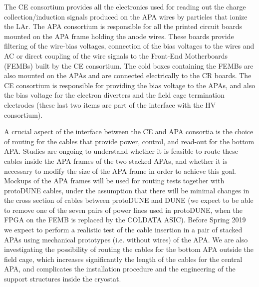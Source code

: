 The CE consortium provides all the electronics used for reading out the charge
collection/induction signals produced on the APA wires by particles that ionize
the LAr. The APA consortium
is responsible for all the printed circuit boards mounted on the APA frame
holding the anode wires. These boards provide filtering of the wire-bias voltages,
connection of the bias voltages to the wires and AC or direct coupling of the
wire signals to the Front-End Motherboards (FEMBs) built by the CE consortium.
The cold boxes containing the FEMBs are also mounted on the APAs and are connected
electrically to the CR boards. The CE consortium is responsible for providing the bias
voltage to the APAs, and also the bias voltage for the electron diverters and the field
cage termination electrodes (these last two items are part of the interface with
the HV consortium).

A crucial aspect of the interface between the CE and APA consortia
is the choice of routing for the cables that provide power, control, and read-out
for the bottom APA. Studies are ongoing to understand whether it is feasible to
route these cables inside the APA frames of the two stacked APAs, and whether it
is necessary to modify the size of the APA frame in order to achieve this goal.
Mockups of the APA frames will be used for routing tests together with protoDUNE
cables, under the assumption that there will be minimal changes in the cross
section of cables between protoDUNE and DUNE (we expect to be able to remove one
of the seven pairs of power lines used in protoDUNE, when the FPGA on the
FEMB is replaced by the COLDATA ASIC). Before Spring 2019 we expect to perform
a realistic test of the cable insertion in a pair of stacked APAs using
mechanical prototypes (i.e. without wires) of the APA. We are also investigating
the possibility of routing the cables for the bottom APA outside the field
cage, which increases significantly the length of the cables for the central
APA, and complicates the installation procedure and the engineering of the
support structures inside the cryostat.
